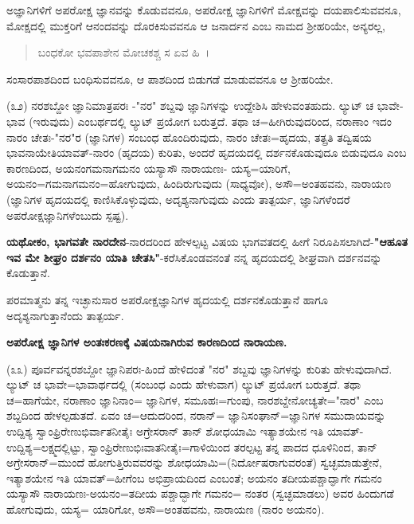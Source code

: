 
ಅಜ್ಞಾನಿಗಳಿಗೆ ಅಪರೋಕ್ಷ ಜ್ಞಾನವನ್ನು ಕೊಡುವವನೂ, ಅಪರೋಕ್ಷ ಜ್ಞಾನಿಗಳಿಗೆ ಮೋಕ್ಷವನ್ನು ದಯಪಾಲಿಸುವವನೂ, ಮೋಕ್ಷದಲ್ಲಿ ಮುಕ್ತರಿಗೆ ಆನಂದವನ್ನು ದೊರಕಿಸುವವನೂ ಆ ಜನಾರ್ದನ ಎಂಬ ನಾಮದ ಶ‍್ರೀಹರಿಯೇ, ಅನ್ಯರಲ್ಲ,

\begin{verse}
ಬಂಧಕೋ ಭವಪಾಶೇನ ಮೋಚಕಶ್ಚ ಸ ಏವ ಹಿ~।
\end{verse}


ಸಂಸಾರಪಾಶದಿಂದ ಬಂಧಿಸುವವನೂ, ಆ ಪಾಶದಿಂದ ಬಿಡುಗಡೆ ಮಾಡುವವನೂ ಆ ಶ‍್ರೀಹರಿಯೇ.

(೩೨) ನರಶಬ್ದೋ ಜ್ಞಾನಿಮಾತ್ರಪರಃ -"ನರ" ಶಬ್ದವು ಜ್ಞಾನಿಗಳನ್ನು ಉದ್ದೇಶಿಸಿ ಹೇಳುವಂತಹುದು. ಲ್ಯುಟ್ ಚ ಭಾವೇ-ಭಾವ (ಇರುವುದು) ಎಂಬರ್ಥದಲ್ಲಿ ಲ್ಯುಟ್ ಪ್ರಯೋಗ ಬರುತ್ತದೆ. ತಥಾ ಚ=ಹೀಗಿರುವುದರಿಂದ, ನರಾಣಾಂ ಇದಂ ನಾರಂ ಚೇತಃ-"ನರ"ರ (ಜ್ಞಾನಿಗಳ) ಸಂಬಂಧ ಹೊಂದಿರುವುದು, ನಾರಂ ಚೇತಃ=ಹೃದಯ, ತತ್ಪ್ರತಿ ತದ್ವಿಷಯ ಭಾವನಾಯೇತಿಯಾವತ್-ನಾರಂ (ಹೃದಯ) ಕುರಿತು, ಅಂದರೆ ಹೃದಯದಲ್ಲಿ ದರ್ಶನಕೊಡುವುದೂ ಬಿಡುವುದೂ ಎಂಬ ಕಾರಣದಿಂದ, ಅಯನಂಗಮನಾಗಮನಂ ಯಸ್ಯಾಸೌ ನಾರಾಯಣಃ- ಯಸ್ಯ=ಯಾರಿಗೆ, ಅಯನಂ=ಗಮನಾಗಮನಂ=ಹೋಗುವುದು, ಹಿಂದಿರುಗುವುದು (ಸಾಧ್ಯವೋ), ಅಸೌ=ಅಂತಹವನು, ನಾರಾಯಣ (ಜ್ಞಾನಿಗಳ ಹೃದಯದಲ್ಲಿ ಕಾಣಿಸಿಕೊಳ್ಳುವುದು, ಅದೃಶ್ಯನಾಗುವುದು ಎಂದು ತಾತ್ಪರ್ಯ, ಜ್ಞಾನಿಗಳೆಂದರೆ ಅಪರೋಕ್ಷಜ್ಞಾನಿಗಳೆಂಬುದು ಸ್ಪಷ್ಟ).

\textbf{ಯಥೋಕಂ, ಭಾಗವತೇ ನಾರದೇನ}-ನಾರದರಿಂದ ಹೇಳಲ್ಪಟ್ಟ ವಿಷಯ ಭಾಗವತದಲ್ಲಿ ಹೀಗೆ ನಿರೂಪಿಸಲಾಗಿದೆ-\textbf{"ಆಹೂತ ಇವ ಮೇ ಶೀಘ್ರಂ ದರ್ಶನಂ ಯಾತಿ ಚೇತಸಿ"}-ಕರೆಸಿಕೊಂಡವನಂತೆ ನನ್ನ ಹೃದಯದಲ್ಲಿ ಶೀಘ್ರವಾಗಿ ದರ್ಶನವನ್ನು ಕೊಡುತ್ತಾನೆ.

ಪರಮಾತ್ಮನು ತನ್ನ ಇಚ್ಛಾನುಸಾರ ಅಪರೋಕ್ಷಜ್ಞಾನಿಗಳ ಹೃದಯಲ್ಲಿ ದರ್ಶನಕೊಡುತ್ತಾನೆ ಹಾಗೂ ಅದೃಶ್ಯನಾಗುತ್ತಾನೆಂದು ತಾತ್ಪರ್ಯ.

\begin{center}
\textbf{ಅಪರೋಕ್ಷ ಜ್ಞಾನಿಗಳ ಅಂತಃಕರಣಕ್ಕೆ ವಿಷಯನಾಗಿರುವ ಕಾರಣದಿಂದ ನಾರಾಯಣ.}
\end{center}

(೩೩) ಪೂರ್ವವನ್ನರಶಬ್ದೋ ಜ್ಞಾನಿಪರಃ-ಹಿಂದೆ ಹೇಳಿದಂತೆ "ನರ" ಶಬ್ದವು ಜ್ಞಾನಿಗಳನ್ನು ಕುರಿತು ಹೇಳುವುದಾಗಿದೆ. ಲ್ಯುಟ್ ಚ ಭಾವೇ=ಭಾವಾರ್ಥದಲ್ಲಿ (ಸಂಬಂಧ ಎಂದು ಹೇಳುವಾಗ) ಲ್ಯುಟ್ ಪ್ರಯೋಗ ಬರುತ್ತದೆ. ತಥಾ ಚ=ಹಾಗೆಯೇ, ನರಾಣಾಂ ಜ್ಞಾನಿನಾಂ= ಜ್ಞಾನಿಗಳ, ಸಮೂಹಃ=ಗುಂಪು, ನಾರಶಬ್ದೇನೋಚ್ಯತೇ="ನಾರ" ಎಂಬ ಶಬ್ದದಿಂದ ಹೇಳಲ್ಪಡುತದೆ. ಏವಂ ಚ=ಆದುದರಿಂದ, ನರಾನ್= ಜ್ಞಾನಿಸಂಘಾನ್=ಜ್ಞಾನಿಗಳ ಸಮುದಾಯವನ್ನು ಉದ್ದಿಶ್ಯ ಸ್ವಾಂಫ್ರಿರೇಣುಭಿರ್ವಾತನೀತೈಃ ಅಗ್ರೇಸರಾನ್ ತಾನ್ ಶೋಧಯಾಮಿ ಇತ್ಯಾಶಯೇನ ಇತಿ ಯಾವತ್‌-ಉದ್ದಿಶ್ಯ=ಲಕ್ಷ್ಮದಲ್ಲಿಟ್ಟು, ಸ್ವಾಂಫ್ರಿರೇಣುಭಿಃವಾತನೀತೈಃ=ಗಾಳಿಯಿಂದ ತರಲ್ಪಟ್ಟ ತನ್ನ ಪಾದದ ಧೂಳಿನಿಂದ, ತಾನ್ ಅಗ್ರೇಸರಾನ್=ಮುಂದೆ ಹೋಗುತ್ತಿರುವವರನ್ನು ಶೋಧಯಾಮಿ=(ನಿರ್ದೋಷರಾಗುವರಂತೆ) ಸ್ವಚ್ಛಮಾಡುತ್ತೇನೆ, ಇತ್ಯಾಶಯೇನ ಇತಿ ಯಾವತ್=ಹೀಗೆಂಬ ಅಭಿಪ್ರಾಯದಿಂದ ಎಂಬಂತೆ; ಅಯನಂ ತದೀಯಪಶ್ಚಾದ್ಘಾಗೇ ಗಮನಂ ಯಸ್ಯಾಸೌ ನಾರಾಯಣಃ-ಅಯನಂ=ತದೀಯ ಪಶ್ಚಾದ್ಭಾಗೇ ಗಮನಂ= ನಂತರ (ಸ್ವಚ್ಛಮಾಡಲು) ಅವರ ಹಿಂದುಗಡೆ ಹೋಗುವುದು, ಯಸ್ಯ= ಯಾರಿಗೋ, ಅಸೌ=ಅಂತಹವನು, ನಾರಾಯಣ (ನಾರಂ ಅಯನಂ).


